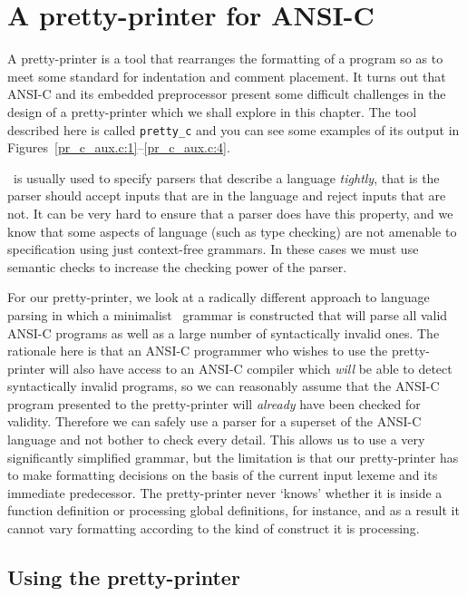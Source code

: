 \chapter{A pretty-printer for ANSI-C} 

A pretty-printer is a tool that rearranges the formatting of a program
so as to meet some standard for indentation and comment placement. It
turns out that ANSI-C and its embedded preprocessor present some
difficult challenges in the design of a pretty-printer which we shall
explore in this chapter. The tool described here is called
\verb+pretty_c+ and you can see some examples of its output in
Figures~\ref{pr_c_aux.c:1}--\ref{pr_c_aux.c:4}.

\rdp\ is usually used to specify parsers that describe a language {\em
tightly}, that is the parser should accept inputs that are in the
language and reject inputs that are not. It can be very hard to ensure that a
parser does have this property, and we know that some aspects of
language (such as type checking) are not amenable to specification using
just context-free grammars. In these cases we must use semantic
checks to increase the checking power of the parser.

For our pretty-printer, we look at a radically different approach to
language parsing in which a minimalist \rdp\ grammar is
constructed that will parse all valid ANSI-C programs as well as a large
number of syntactically invalid ones. The rationale here is that an
ANSI-C programmer who wishes to use the pretty-printer will also have
access to an ANSI-C compiler which {\em will} be able to detect
syntactically invalid programs, so we can reasonably assume that the
ANSI-C program presented to the pretty-printer will {\em already} have
been checked for validity. Therefore we can safely use a parser for a
superset of the ANSI-C language and not bother to check every detail.
This allows us to use a very significantly simplified grammar, but the
limitation is that our pretty-printer has to make formatting decisions on the
basis of the current input lexeme and its immediate predecessor. The pretty-printer
never `knows' whether it is inside a function definition or processing global definitions,
for instance, and as a result it cannot vary formatting according to the kind of construct
it is processing.

\section{Using the pretty-printer}

